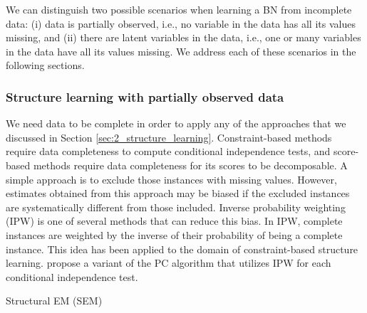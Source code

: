 We can distinguish two possible scenarios when learning a BN from incomplete data: (i) data is partially observed, i.e., no variable in the data has all its values missing, and (ii) there are latent variables in the data, i.e., one or many variables in the data have all its values missing. We address each of these scenarios in the following sections.


\subsubsection*{Structure learning with partially observed data}

We need data to be complete in order to apply any of the approaches that we discussed in Section \ref{sec:2_structure_learning}. Constraint-based methods require data completeness to compute conditional independence tests, and score-based methods require data completeness for its scores to be decomposable. A simple approach is to exclude those instances with missing values. However, estimates obtained from this approach may be biased if the excluded instances are systematically different from those included. Inverse probability weighting (IPW) \citep{horvitz1952, robins1994} is one of several methods that can reduce this bias. In IPW, complete instances are weighted by the inverse of their probability of being a complete instance. This idea has been applied to the domain of constraint-based structure learning. \cite{gain2018} propose a variant of the PC algorithm that utilizes IPW for each conditional independence test.


\begin{algorithm}[t!]
	\SetNoFillComment
	
	\BlankLine
	
	
	\BlankLine
	\caption{Structural EM (SEM)}
	\label{alg:2_sem}
\end{algorithm}

